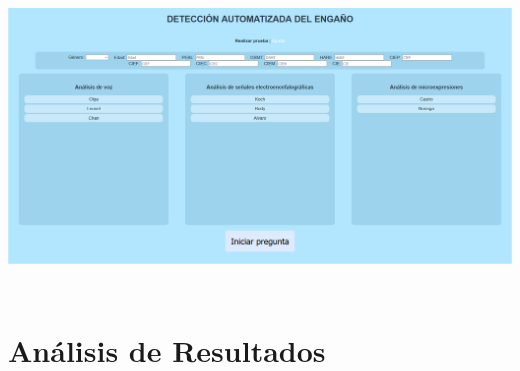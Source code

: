 \begin{center}
\includegraphics[height=3.15in]{figuras/Imagen20.PNG}
\end{center}



\chapter{Análisis de Resultados}
